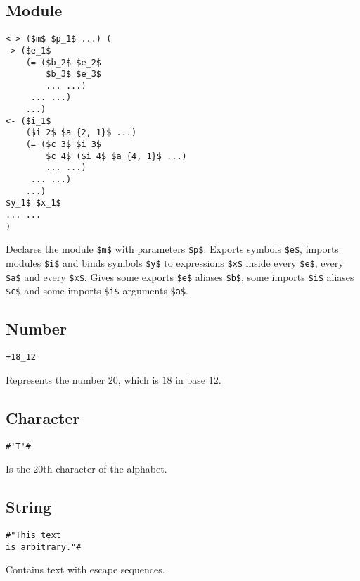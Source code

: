 \documentclass{article}
\begin{document}
\begin{multicols}
\columnbreak

\bigskip\subsection*{Module}
\begin{lstlisting}
<-> ($m$ $p_1$ ...) (
-> ($e_1$
    (= ($b_2$ $e_2$
        $b_3$ $e_3$
        ... ...)
     ... ...)
    ...)
<- ($i_1$
    ($i_2$ $a_{2, 1}$ ...)
    (= ($c_3$ $i_3$
        $c_4$ ($i_4$ $a_{4, 1}$ ...)
        ... ...)
     ... ...)
    ...)
$y_1$ $x_1$
... ...
)
\end{lstlisting}
Declares the module \lstinline{$m$} with parameters \lstinline{$p$}.
Exports symbols \lstinline{$e$},
imports modules \lstinline{$i$} and
binds symbols \lstinline{$y$} to expressions \lstinline{$x$}
inside every \lstinline{$e$}, every \lstinline{$a$} and every \lstinline{$x$}.
Gives some exports \lstinline{$e$} aliases \lstinline{$b$},
some imports \lstinline{$i$} aliases \lstinline{$c$} and
some imports \lstinline{$i$} arguments \lstinline{$a$}.

\bigskip\subsection*{Number}
\begin{lstlisting}
+18_12
\end{lstlisting}
Represents the number $20$, which
is $18$ in base $12$.

\bigskip\subsection*{Character}
\begin{lstlisting}
#'T'#
\end{lstlisting}
Is the $20$th character of the alphabet.

\bigskip\subsection*{String}
\begin{lstlisting}
#"This text
is arbitrary."#
\end{lstlisting}
Contains text with escape sequences.


\end{multicols}
\end{document}
